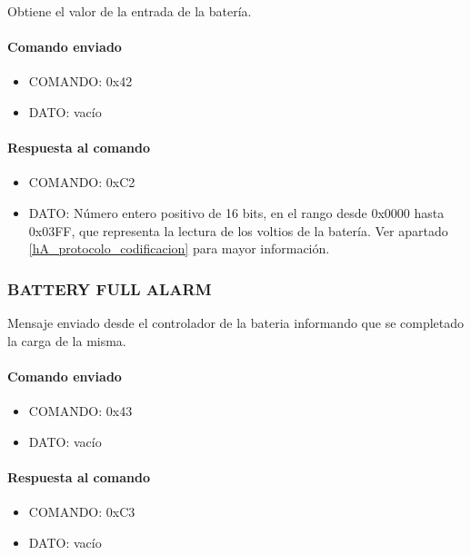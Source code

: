 Obtiene el valor de la entrada de la bater\'ia.

\paragraph*{Comando enviado}

\begin{itemize}
	\item{COMANDO:} 0x42
	\item{DATO:} vac\'io
\end{itemize}

\paragraph*{Respuesta al comando}

\begin{itemize}
	\item{COMANDO:} 0xC2
	\item{DATO:} N\'umero entero positivo de 16 bits, en el rango desde 0x0000 hasta 0x03FF, que representa la lectura de los voltios de la bater\'ia.
		Ver apartado \ref{hA_protocolo_codificacion} para mayor informaci\'on.

\end{itemize}

\subsubsection{BATTERY FULL ALARM}
\label{hA_protocolo_battery_full_alarm}

Mensaje enviado desde el controlador de la bateria informando que se completado la carga de la misma.

\paragraph*{Comando enviado}

\begin{itemize}
	\item{COMANDO:} 0x43
	\item{DATO:} vac\'io
\end{itemize}

\paragraph*{Respuesta al comando}

\begin{itemize}
	\item{COMANDO:} 0xC3
	\item{DATO:} vac\'io
\end{itemize}

